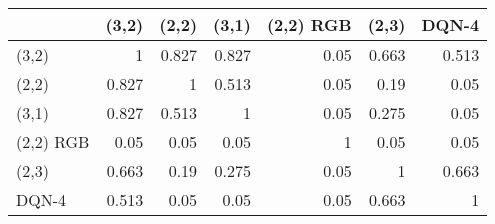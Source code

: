 \begin{tabular}{lrrrrrr}
\hline
           &   (3,2) &   (2,2) &   (3,1) &   (2,2) RGB &   (2,3) &   DQN-4 \\
\hline
 (3,2)     &   1     &   0.827 &   0.827 &        0.05 &   0.663 &   0.513 \\
 (2,2)     &   0.827 &   1     &   0.513 &        0.05 &   0.19  &   0.05  \\
 (3,1)     &   0.827 &   0.513 &   1     &        0.05 &   0.275 &   0.05  \\
 (2,2) RGB &   0.05  &   0.05  &   0.05  &        1    &   0.05  &   0.05  \\
 (2,3)     &   0.663 &   0.19  &   0.275 &        0.05 &   1     &   0.663 \\
 DQN-4     &   0.513 &   0.05  &   0.05  &        0.05 &   0.663 &   1     \\
\hline
\end{tabular}